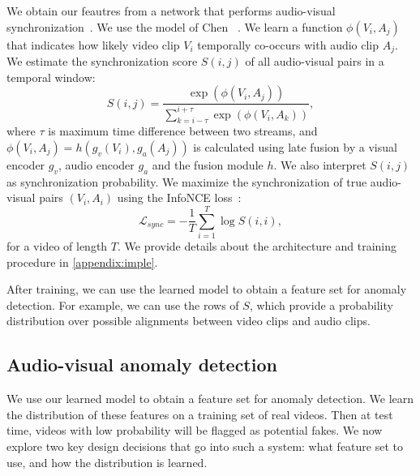 \documentclass[10pt,twocolumn,letterpaper]{article}
\newcommand{\supparxiv}[2]{#2}
\begin{document}
We obtain our feautres from a network that performs audio-visual synchronization~\cite{chung2019perfect,chung2016out,owens2018audio,chen2021audio}. We use the model of Chen \etal~\cite{chen2021audio}. We learn a function $\phi(V_i, A_j)$ that indicates how likely video clip $V_i$ temporally co-occurs with audio clip $A_j$. We estimate the synchronization score $S(i,j)$ of all audio-visual pairs in a temporal window: \begin{equation}
    S(i,j) = \frac{\exp{\left(\phi(V_i, A_j)\right)}}
    {\sum_{k=i-\tau}^{i+\tau}\exp{\left(\phi(V_i, A_k)\right)}},
    \label{sync_score}
\end{equation}
where $\tau$ is maximum time difference between two streams, and $\phi(V_i, A_j) = h\left(g_v(V_i), g_a(A_j)\right)$ is calculated using late fusion by a visual encoder $g_v$, audio encoder $g_a$ and the fusion module $h$. We also interpret $S(i,j)$ as synchronization probability. We maximize the synchronization of true audio-visual pairs $(V_{i},A_{i})$ using the InfoNCE loss~\cite{oord2018representation}: 
\begin{equation}
    \mathcal{L}_{sync} = - \frac{1}{T} \sum_{i=1}^{T}  \log S(i, i),
    \label{infonce}
\end{equation}
for a video of length $T$. We provide details about the architecture and training procedure in \supparxiv{the supplement}{\cref{appendix:imple}}.

After training, we can use the learned model to obtain a feature set for anomaly detection. For example, we can use the rows of $S$, which provide a probability distribution over possible alignments between video clips and audio clips.












\subsection{Audio-visual anomaly detection}\label{av_anomaly}

We use our learned model to obtain a feature set for anomaly detection.  We learn the distribution of these features on a training set of real videos. Then at test time, videos with low probability will be flagged as potential fakes. We now explore two key design decisions that go into such a system: what feature set to use, and how the distribution is learned. 
\end{document}
